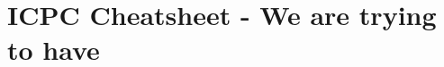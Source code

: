 \documentclass{article}
\begin{document}
\section*{ICPC Cheatsheet - We are trying to have}

\makeatletter
{}
\makeatother



\newpage













\end{document}
